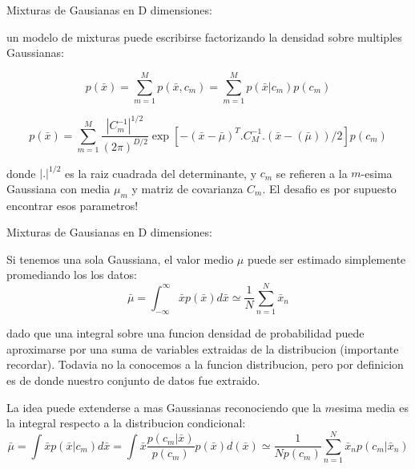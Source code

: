 \documentclass[ignorenonframetext,]{beamer}
\begin{document}
\begin{frame}

\begin{block}{Mixturas de Gausianas en D dimensiones:}

un modelo de mixturas puede escribirse factorizando la densidad sobre
multiples Gaussianas:

\[p(\bar{x})=\sum_{m=1}^{M}p(\bar{x}, c_{m})=\sum_{m=1}^{M}p(\bar{x}|c_{m})p(c_{m})\]

\[p(\bar{x})=\sum_{m=1}^{M} \frac{|C_{m}^{-1}|^{1/2}}{(2 \pi)^{D/2}} \exp[{-(\bar{x}-\bar{\mu})^{T}.C_{M}^{-1}.(\bar{x}-(\bar{\mu}))/2}]p(c_{m})\]

donde \(|.|^{1/2}\) es la raiz cuadrada del determinante, y \(c_{m}\) se
refieren a la \(m\)-esima Gaussiana con media \(\mu_{m}\) y matriz de
covarianza \(C_{m}\). El desafio es por supuesto encontrar esos
parametros!

\end{block}

\end{frame}

\begin{frame}

\begin{block}{Mixturas de Gausianas en D dimensiones:}

Si tenemos una sola Gaussiana, el valor medio \(\mu\) puede ser estimado
simplemente promediando los los datos:
\[ \bar{\mu}=\int_{-\infty}^{\infty} \bar{x} p(\bar{x}) d\bar{x} \simeq \frac{1}{N} \sum_{n=1}^{N} \bar{x}_{n}\]

dado que una integral sobre una funcion densidad de probabilidad puede
aproximarse por una suma de variables extraidas de la distribucion
(importante recordar). Todavia no la conocemos a la funcion
distribucion, pero por definicion es de donde nuestro conjunto de datos
fue extraido.

La idea puede extenderse a mas Gaussianas reconociendo que la \(m\)esima
media es la integral respecto a la distribucion condicional:
\[\bar{\mu}=\int \bar{x} p(\bar{x} | c_{m}) d\bar{x} = \int \bar{x} \frac{p(c_{m}|\bar{x})}{p(c_m)}p(\bar{x})d(\bar{x}) \simeq \frac{1}{Np(c_{m})}\sum_{n=1}^{N} \bar{x}_{n} p(c_{m} | \bar{x}_{n})\]

\end{block}

\end{frame}
\end{document}

